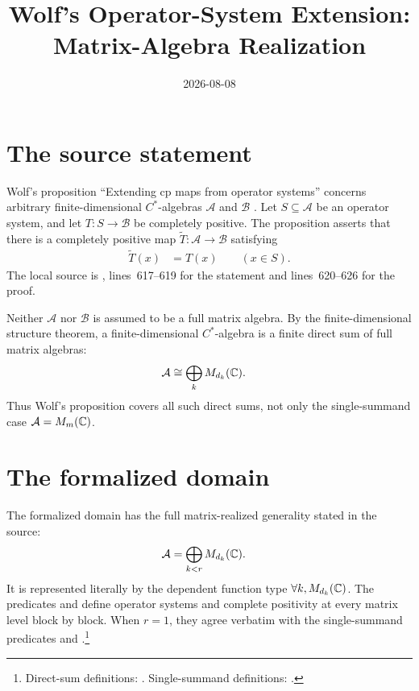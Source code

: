 \documentclass{article}
\title{Wolf's Operator-System Extension: Matrix-Algebra Realization}
\author{}
\date{2026-08-08}
\begin{document}
\maketitle
{}

\section{The source statement}

Wolf's proposition ``Extending cp maps from operator systems'' concerns
arbitrary finite-dimensional $C^\ast$-algebras $\mathcal A$ and $\mathcal B$
\cite[lines~614--626]{Wolf2012Quantum}. Let $S\subseteq\mathcal A$ be an
operator system, and let $T:S\to\mathcal B$ be completely positive. The
proposition asserts that there is a completely positive map
$\widetilde T:\mathcal A\to\mathcal B$ satisfying
\begin{align}
    \widetilde T(x)
        &=T(x)
        \qquad(x\in S).
    \label{eq:wolf_ch01_operator_system_extension_matrix_scope_extension_agreement}
\end{align}
The local source is
, lines~617--619
for the statement and lines~620--626 for the proof.

Neither $\mathcal A$ nor $\mathcal B$ is assumed to be a full matrix algebra.
By the finite-dimensional structure theorem, a finite-dimensional
$C^\ast$-algebra is a finite direct sum of full matrix algebras:
\begin{align}
    \mathcal A
        &\cong\bigoplus_k M_{d_k}(\mathbb{C}).
    \label{eq:wolf_ch01_operator_system_extension_matrix_scope_fd_cstar_structure}
\end{align}
Thus Wolf's proposition covers all such direct sums, not only the
single-summand case $\mathcal A=M_m(\mathbb{C})$.

\section{The formalized domain}

The formalized domain has the full matrix-realized generality stated in the
source:
\begin{align}
    \mathcal A
        &=\bigoplus_{k<r}M_{d_k}(\mathbb{C}).
    \label{eq:wolf_ch01_operator_system_extension_matrix_scope_direct_sum_domain}
\end{align}
It is represented literally by the dependent function type
$\forall k,M_{d_k}(\mathbb{C})$. The predicates
 and
 define operator systems and
complete positivity at every matrix level block by block. When $r=1$, they
agree verbatim with the single-summand predicates
 and
.\footnote{Direct-sum definitions:
. Single-summand
definitions: .}
\end{document}
